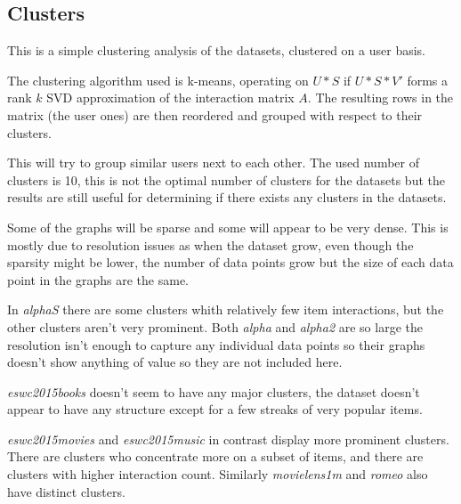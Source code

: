 

\subsection{Clusters}\label{sec:result:clusters}

This is a simple clustering analysis of the datasets, clustered on a user basis.

The clustering algorithm used is k-means, operating on $U * S$ if $U * S * V'$ forms a rank $k$ SVD approximation of the interaction matrix $A$. The resulting rows in the matrix (the user ones) are then reordered and grouped with respect to their clusters.

This will try to group similar users next to each other. The used number of clusters is 10, this is not the optimal number of clusters for the datasets but the results are still useful for determining if there exists any clusters in the datasets.

Some of the graphs will be sparse and some will appear to be very dense. This is mostly due to resolution issues as when the dataset grow, even though the sparsity might be lower, the number of data points grow but the size of each data point in the graphs are the same.

\FloatBarrier


In \textit{alphaS} there are some clusters whith relatively few item interactions, but the other clusters aren't very prominent. Both \textit{alpha} and \textit{alpha2} are so large the resolution isn't enough to capture any individual data points so their graphs doesn't show anything of value so they are not included here.


\FloatBarrier

\textit{eswc2015books} doesn't seem to have any major clusters, the dataset doesn't appear to have any structure except for a few streaks of very popular items.

\FloatBarrier



\textit{eswc2015movies} and \textit{eswc2015music} in contrast display more prominent clusters. There are clusters who concentrate more on a subset of items, and there are clusters with higher interaction count.  Similarly \textit{movielens1m} and \textit{romeo} also have distinct clusters.



\FloatBarrier

